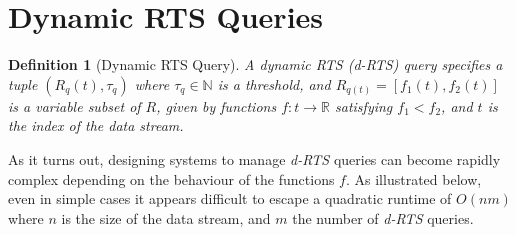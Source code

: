 \documentclass{article}
\newtheorem{definition}{Definition}
\begin{document}
\hspace{95mm}

\section*{Dynamic RTS Queries}

\begin{definition}[Dynamic RTS Query] A dynamic RTS (\textit{d-RTS}) query specifies a tuple $(R_q(t), \tau_q)$ where $\tau_q \in \mathbb{N}$
    is a threshold, and $R_{q(t)} =[f_1(t), f_2(t)]$ is a variable subset of $R$, given by functions $f: t\rightarrow\mathbb{R}$ satisfying $f_1 < f_2$, and $t$ is the index of the data stream.
\end{definition}

As it turns out, designing systems to manage \textit{d-RTS} queries can become rapidly complex depending on the behaviour of the functions $f$. As illustrated below, even in simple cases it appears difficult to escape a quadratic runtime of $O(nm)$ where $n$ is the size of the data stream, and $m$ the number of \textit{d-RTS} queries.
\end{document}
